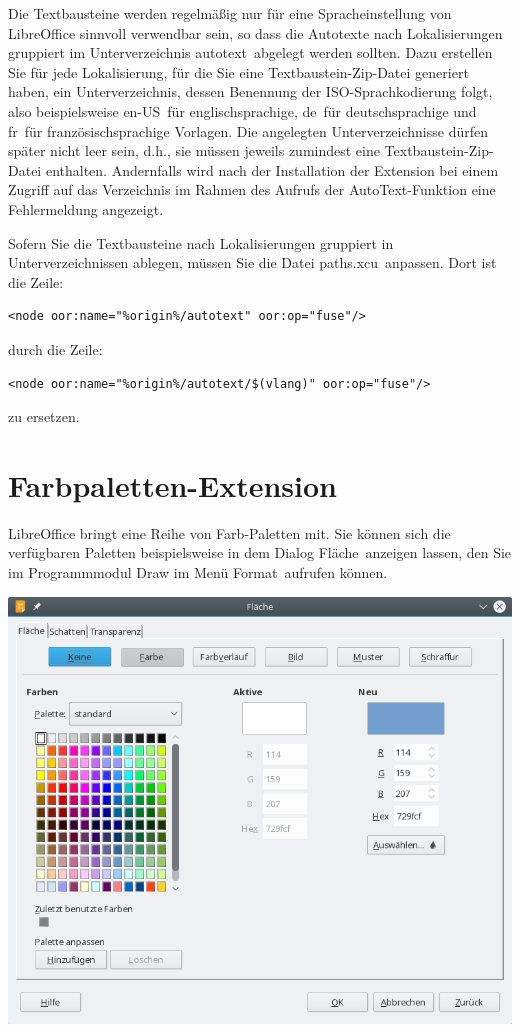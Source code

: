 \documentclass[a4paper,10pt,pagesize,titlepage]{scrbook}
\begin{document}
Die Textbausteine werden regelmäßig nur für eine Spracheinstellung von LibreOffice sinnvoll verwendbar sein, so dass die Autotexte nach Lokalisierungen gruppiert im Unterverzeichnis \glqq autotext\grqq~abgelegt werden sollten. Dazu erstellen Sie für jede Lokalisierung, für die Sie eine Textbaustein-Zip-Datei generiert haben, ein Unterverzeichnis, dessen Benennung der ISO-Sprachkodierung folgt, also  beispielsweise \glqq en-US\grqq~für englischsprachige, \glqq de\grqq~für deutschsprachige und \glqq fr\grqq~für französischsprachige Vorlagen. Die angelegten Unterverzeichnisse dürfen später nicht leer sein, d.h., sie müssen jeweils zumindest eine Textbaustein-Zip-Datei enthalten. Andernfalls wird nach der Installation der Extension bei einem Zugriff auf das Verzeichnis im Rahmen des Aufrufs der AutoText-Funktion eine Fehlermeldung angezeigt.

Sofern Sie die Textbausteine nach Lokalisierungen gruppiert in Unterverzeichnissen ablegen, müssen Sie die Datei \glqq paths.xcu\grqq~anpassen. Dort ist die Zeile:
\begin{lstlisting}
<node oor:name="%origin%/autotext" oor:op="fuse"/>
\end{lstlisting}

durch die Zeile:
\begin{lstlisting}
<node oor:name="%origin%/autotext/$(vlang)" oor:op="fuse"/>
\end{lstlisting}

zu ersetzen.

\section{Farbpaletten-Extension}

LibreOffice bringt eine Reihe von Farb-Paletten mit. Sie können sich die verfügbaren Paletten beispielsweise in dem Dialog \glqq Fläche\grqq~anzeigen lassen, den Sie im Programmmodul Draw im Menü \glqq Format\grqq~aufrufen können.

\begin{center}
	\includegraphics[width=0.9\linewidth]{pics/dialog_flaeche}
	\label{fig:dialog_flaeche}
\end{center}
\end{document}
